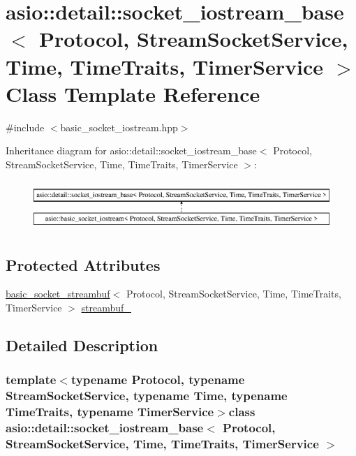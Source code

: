 \hypertarget{classasio_1_1detail_1_1socket__iostream__base}{}\section{asio\+:\+:detail\+:\+:socket\+\_\+iostream\+\_\+base$<$ Protocol, Stream\+Socket\+Service, Time, Time\+Traits, Timer\+Service $>$ Class Template Reference}
\label{classasio_1_1detail_1_1socket__iostream__base}


{\ttfamily \#include $<$basic\+\_\+socket\+\_\+iostream.\+hpp$>$}

Inheritance diagram for asio\+:\+:detail\+:\+:socket\+\_\+iostream\+\_\+base$<$ Protocol, Stream\+Socket\+Service, Time, Time\+Traits, Timer\+Service $>$\+:\begin{figure}[H]
\begin{center}
\leavevmode
\includegraphics[height=1.882353cm]{classasio_1_1detail_1_1socket__iostream__base}
\end{center}
\end{figure}
\subsection*{Protected Attributes}
\begin{DoxyCompactItemize}
\item 
\hyperlink{classasio_1_1basic__socket__streambuf}{basic\+\_\+socket\+\_\+streambuf}$<$ Protocol, Stream\+Socket\+Service, Time, Time\+Traits, Timer\+Service $>$ \hyperlink{classasio_1_1detail_1_1socket__iostream__base_ac5d4983a9fb3035497092a1de10616d6}{streambuf\+\_\+}
\end{DoxyCompactItemize}


\subsection{Detailed Description}
\subsubsection*{template$<$typename Protocol, typename Stream\+Socket\+Service, typename Time, typename Time\+Traits, typename Timer\+Service$>$class asio\+::detail\+::socket\+\_\+iostream\+\_\+base$<$ Protocol, Stream\+Socket\+Service, Time, Time\+Traits, Timer\+Service $>$}



